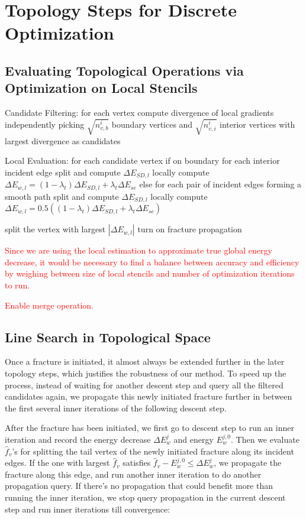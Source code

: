 \section{Topology Steps for Discrete Optimization}

\subsection{Evaluating Topological Operations via Optimization on Local Stencils}

Candidate Filtering:
for each vertex
  compute divergence of local gradients
independently picking $\sqrt{n_{v,b}^i}$ boundary vertices and $\sqrt{n_{v,i}^i}$ interior vertices with largest divergence as candidates

Local Evaluation:
for each candidate vertex
  if on boundary
    for each interior incident edge
      split and compute $\Delta E_{SD,l}$ locally
      compute $\Delta E_{w,l} = (1 - \lambda_t) \Delta E_{SD,l} + \lambda_t \Delta E_{se}$
  else
    for each pair of incident edges forming a smooth path
      split and compute $\Delta E_{SD,l}$ locally
      compute $\Delta E_{w,l} = 0.5((1 - \lambda_t) \Delta E_{SD,l} + \lambda_t \Delta E_{se})$

split the vertex with largest $|\Delta E_{w,l}|$
turn on fracture propagation

\textcolor{red}{
Since we are using the local estimation to approximate true global energy decrease, it would be necessary to find a balance between accuracy and efficiency by weighing between size of local stencils and number of optimization iterations to run.
}

\textcolor{red}{
Enable merge operation.
}

\subsection{Line Search in Topological Space}

Once a fracture is initiated, it almost always be extended further in the later topology steps, which justifies the robustness of our method. To speed up the process, instead of waiting for another descent step and query all the filtered candidates again, we propagate this newly initiated fracture further in between the first several inner iterations of the following descent step.

After the fracture has been initiated, we first go to descent step to run an inner iteration and record the energy decrease $\Delta E_w^j$ and energy $E_w^{j,0}$. Then we evaluate $\hat{f}_v$'s for splitting the tail vertex of the newly initiated fracture along its incident edges. If the one with largest $\hat{f}_v$ satisfies $\hat{f}_v - E_w^{j,0} \leq \Delta E_w^j$, we propagate the fracture along this edge, and run another inner iteration to do another propagation query. If there's no propagation that could benefit more than running the inner iteration, we stop query propagation in the current descent step and run inner iterations till convergence:

